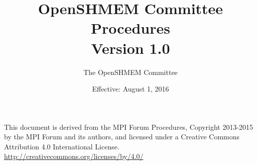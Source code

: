\documentclass[twoside,fleqn]{book}
\begin{document}
\title{OpenSHMEM Committee Procedures \\
Version 1.0}
\author{The OpenSHMEM Committee}
\date{Effective: August 1, 2016}

\maketitle

\null\vfill
\thispagestyle{empty}
\noindent
This document is derived from the MPI Forum Procedures, Copyright 2013-2015 by
the MPI Forum and its authors, and licensed under a
Creative Commons Attribution 4.0 International
License. \url{http://creativecommons.org/licenses/by/4.0/}







\end{document}
